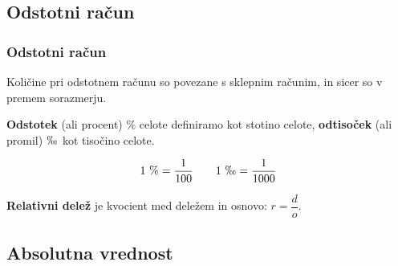     \subsection{Odstotni račun}

        \begin{frame}
            \frametitle{Odstotni račun}

            \begin{block}{}
                Količine pri odstotnem računu so povezane s sklepnim računim, in sicer so v premem sorazmerju.
            \end{block}

            \begin{alertblock}{}
                \textbf{Odstotek} (ali procent) $\text{\%}$ celote definiramo kot stotino celote,
                \textbf{odtisoček} (ali promil) $\permil$ kot tisočino celote.

                $$ 1~\text{\%}=\dfrac{1}{100} \quad \quad 1~\permil=\dfrac{1}{1000}$$
            \end{alertblock}

            \begin{alertblock}{}
                \textbf{Relativni delež} je kvocient med deležem in osnovo: $r=\dfrac{d}{o}$.
            \end{alertblock}

        \end{frame}

    

    \subsection{Absolutna vrednost}

